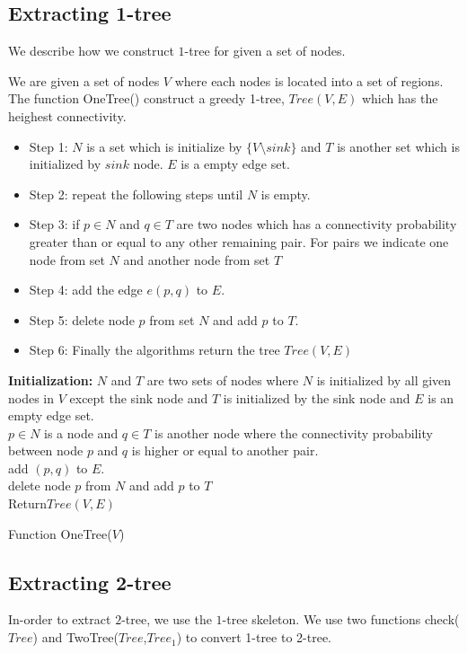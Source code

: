 \documentclass[12pt]{article}
\begin{document}
\subsection{Extracting 1-tree}
We describe how we construct $1$-tree for given a set of nodes.

We are given a set of nodes $V$ where each nodes is located into a set of regions. The function OneTree() construct a greedy 1-tree, $Tree(V,E)$ which has the heighest connectivity.
\begin{itemize}[noitemsep]
\item Step 1: $N$ is a set which is initialize by $\{V\setminus sink\}$ and $T$ is another set which is initialized by $sink$ node. $E$ is a empty edge set.
\item Step 2: repeat the following steps until $N$ is empty.
\item Step 3: if $p\in N$ and $q\in T$ are two nodes which has a connectivity probability greater than or equal to any other remaining pair. For pairs we indicate one node from set $N$ and another node from set $T$
\item Step 4: add the edge $e(p,q)$ to $E$.
\item  Step 5: delete node $p$ from set $N$ and add $p$ to $T$. 
\item  Step 6: Finally the algorithms return the tree $Tree(V,E)$
\end{itemize}
 
\begin{algorithm}

\nl \textbf{Initialization: } $N$ and $T$ are two sets of nodes where $N$ is initialized by all given nodes in $V$ except the sink node and $T$ is initialized by the sink node and $E$ is an empty edge set.\\
\nl {}
{
\nl $p\in N$ is a node and $q\in T$ is another node where  the connectivity probability between node $p$ and $q$ is higher or equal to another pair.\\
\nl add $(p,q)$ to $E$.\\
\nl delete node $p$ from $N$ and add $p$ to $T$\\
}
\nl Return{$Tree(V,E)$}
\caption{Function OneTree($V$)}
\end{algorithm}
\subsection{Extracting 2-tree}
In-order to extract $2$-tree, we use the $1$-tree skeleton.
We use two functions check($Tree$) and TwoTree($Tree$,$Tree_1$) to convert  1-tree to 2-tree.
\end{document}
